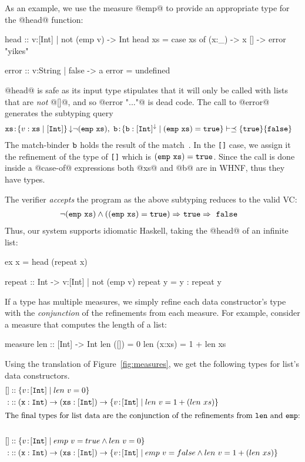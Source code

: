 \label{sec:pattern-match}
As an example, we use the measure @emp@ to 
provide an appropriate type for the @head@ function:
%
\begin{code}
  head    :: {v:[Int] | not (emp v)} -> Int 
  head xs = case xs of
              (x:_) -> x
              []    -> error "yikes"  

  error   :: {v:String | false} -> a
  error   = undefined
\end{code}
%
@head@ is safe as its input type stipulates that it will only 
be called with lists that are \emph{not} @[]@, and so
@error "..."@ is dead code.
%
The call to @error@ generates the subtyping query
%
\begin{align*}
   \tbind{\ttxs}{\tref{\ttxs}{[\tint]}{\trivial}{\lnot (\ttemp\ \ttxs)}}, \
   \tbind{\ttb}{\tttref{\ttb}{[\tint]}{\trivial}{(\ttemp\ \ttxs)= true}} 	
	 & \vdash \subtref{\tttrue}{\ttfalse} 
\end{align*}
%
The match-binder $\mathtt{b}$ holds the result of the 
match~\cite{SulzmannCJD07}. In the \texttt{[]} case,
we assign it the refinement of the type of \texttt{[]} 
which is $(\mathtt{emp}\ \mathtt{xs}) = \mathtt{true}$. %
%
Since the call is done inside a @case-of@ expressions 
both @xs@ and @b@ are in WHNF,
thus they have \Wnf types. 
  
The verifier \emph{accepts} the program as the above subtyping reduces to the valid VC:
\begin{align*}
\lnot (\ttemp\ \ttxs) \wedge ((\ttemp\ \ttxs)= \tttrue) \Rightarrow\ & \tttrue \Rightarrow\ \ttfalse
\end{align*}
%
Thus, our system supports idiomatic 
Haskell, \eg taking the @head@ of an infinite list:
%
\begin{code}
  ex x     = head (repeat x)
  
  repeat   :: Int -> {v:[Int] | not (emp v)}
  repeat y = y : repeat y
\end{code}
%

If a type has multiple measures, we simply refine each data constructor's type
with the \emph{conjunction} of the refinements from each measure.
%
For example, consider a measure that computes the length of a list:
\begin{code}
  measure len  :: [Int] -> Int
    len ([])   = 0
    len (x:xs) = 1 + len xs
\end{code}
%
Using the translation of Figure~\ref{fig:measures},
we get the following types for list's data constructors.
%
\begin{align*}
\text{[]}  & ::  \ttreft{v}{[\tint]}{len\ v = 0}\\
{:}  & ::  \tfun{\ttx}{\tint}{\tfun{\ttxs}{[\tint]}{\ttreft{v}{[\tint]}{len\ v = 1 + (len\ xs)}}}\\
\intertext{The final types for list data are the 
conjunction of the refinements from $\mathtt{len}$ and $\mathtt{emp}$:}\\
\text{[]}  & ::  \ttreft{v}{[\tint]}{emp\ v = true \land len\ v = 0}\\
{:}  & ::  \tfun{\ttx}{\tint}{\tfun{\ttxs}{[\tint]}
           {\ttreft{v}{[\tint]}{emp\ v = false \land len\ v = 1 + (len\ xs)}}}
\end{align*}


